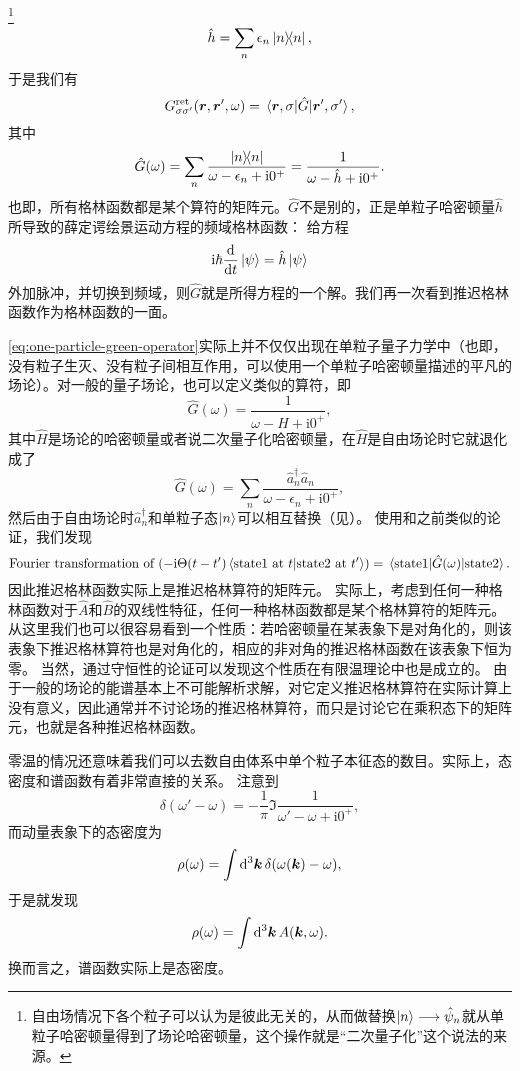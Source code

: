 \documentclass[hyperref, UTF8, a4paper]{ctexart}
\newcommand*{\ii}{\mathrm{i}}
\renewcommand{\autoref}{\prettyref}
\begin{document}
\footnote{自由场情况下各个粒子可以认为是彼此无关的，从而做替换$\ket{n} \longrightarrow \hat{\psi}_n$就从单粒子哈密顿量得到了场论哈密顿量，这个操作就是“二次量子化”这个说法的来源。\label{note:second-quantization}
}%
\[
    \hat{h} = \sum_n \epsilon_n \dyad{n},
\]
于是我们有
\begin{equation}
    G^\text{ret}_{\sigma \sigma'}(\vb*{r}, \vb*{r}', \omega) = \mel{\vb*{r}, \sigma}{\hat{G}}{\vb*{r}', \sigma'},
\end{equation}
其中
\begin{equation}
    \hat{G}(\omega) = \sum_n \frac{\dyad{n}}{\omega - \epsilon_n + \ii 0^+} = \frac{1}{\omega - \hat{h} + \ii 0^+}.
    \label{eq:one-particle-green-operator}
\end{equation}
也即，所有格林函数都是某个算符的矩阵元。$\hat{G}$不是别的，正是单粒子哈密顿量$\hat{h}$所导致的薛定谔绘景运动方程的频域格林函数：
给方程
\[
    \ii \hbar \dv{t} \ket{\psi} = \hat{h} \ket{\psi}
\]
外加脉冲，并切换到频域，则$\hat{G}$就是所得方程的一个解。我们再一次看到推迟格林函数作为格林函数的一面。

\eqref{eq:one-particle-green-operator}实际上并不仅仅出现在单粒子量子力学中（也即，没有粒子生灭、没有粒子间相互作用，可以使用一个单粒子哈密顿量描述的平凡的场论）。对一般的量子场论，也可以定义类似的算符，即
\[
    \hat{G}(\omega) = \frac{1}{\omega - \hat{H} + \ii 0^+},
\]
其中$\hat{H}$是场论的哈密顿量或者说二次量子化哈密顿量，在$\hat{H}$是自由场论时它就退化成了
\[
    \hat{G}(\omega) = \sum_n \frac{\hat{a}_n^\dagger \hat{a}_n}{\omega - \epsilon_n + \ii 0^+},
\]
然后由于自由场论时$\hat{a}^\dagger_n$和单粒子态$\ket{n}$可以相互替换（见\autoref{note:second-quantization}）。
使用和之前类似的论证，我们发现
\[
    \text{Fourier transformation of }(- \ii \Theta(t-t') \braket{\text{state1 at $t$}}{\text{state2 at $t'$}}) = \mel{\text{state1}}{\hat{G}(\omega)}{\text{state2}}.
\]
因此推迟格林函数实际上是推迟格林算符的矩阵元。
实际上，考虑到任何一种格林函数对于$\hat{A}$和$\hat{B}$的双线性特征，任何一种格林函数都是某个格林算符的矩阵元。
从这里我们也可以很容易看到一个性质：若哈密顿量在某表象下是对角化的，则该表象下推迟格林算符也是对角化的，相应的非对角的推迟格林函数在该表象下恒为零。
当然，通过守恒性的论证可以发现这个性质在有限温理论中也是成立的。
由于一般的场论的能谱基本上不可能解析求解，对它定义推迟格林算符在实际计算上没有意义，因此通常并不讨论场的推迟格林算符，而只是讨论它在乘积态下的矩阵元，也就是各种推迟格林函数。

零温的情况还意味着我们可以去数自由体系中单个粒子本征态的数目。实际上，态密度和谱函数有着非常直接的关系。
注意到
\[
    \delta(\omega' - \omega) = - \frac{1}{\pi} \Im \frac{1}{\omega' - \omega + \ii 0^+},
\]
而动量表象下的态密度为
\[
    \rho(\omega) = \int \dd[3]{\vb*{k}} \delta(\omega(\vb*{k}) - \omega),
\]
于是就发现
\begin{equation}
    \rho(\omega) = \int \dd[3]{\vb*{k}} A(\vb*{k}, \omega).
\end{equation}
换而言之，谱函数实际上是态密度。
\end{document}
